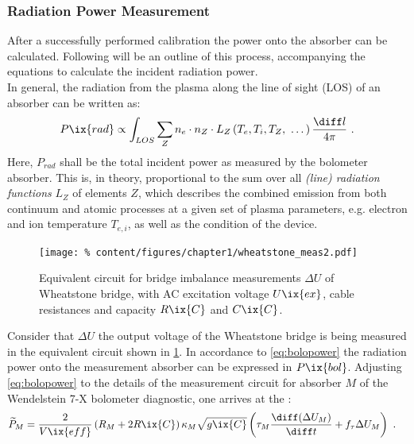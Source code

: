             \subsubsection*{Radiation Power Measurement}%
%
                After a successfully performed calibration the power onto the absorber can be calculated. Following will be an outline of this process, accompanying the equations to calculate the incident radiation power.\\%
                In general, the radiation from the plasma along the line of sight (LOS) of an absorber can be written as:%
%
                \begin{align}%
                    P\ix{rad}\propto\int_{LOS}\sum_{Z}n_{e}\cdot n_{Z}\cdot L_{Z}\left(T_{e}, T_{i}, T_{Z},\,\,\dots\right)\frac{\diff l}{4\pi}\,\,.\label{eq:lineradiation}%
                \end{align}%
%
                Here, $P_{rad}$ shall be the total incident power as measured by the bolometer absorber. This is, in theory, proportional to the sum over all \textit{(line) radiation functions} $L_{Z}$ of elements $Z$, which describes the combined emission from both continuum and atomic processes at a given set of plasma parameters, e.g. electron and ion temperature $T_{e,i}$, as well as the condition of the device.\\%
%
                \begin{figure}
                    \centering%
                    \texttt{[image: \%
                        content/figures/chapter1/wheatstone\_meas2.pdf]}%
                    \caption{Equivalent circuit for bridge imbalance measurements $\Delta U$ of Wheatstone bridge, with AC excitation voltage $U\ix{ex}$, cable resistances and capacity $R\ix{C}$ and $C\ix{C}$.}\label{fig:wheatstone_meas}%
                \end{figure}
%
                Consider that $\Delta U$ the output voltage of the Wheatstone bridge is being measured in the equivalent circuit shown in \cref{fig:wheatstone_meas}. In accordance to \cref{eq:bolopower} the radiation power onto the measurement absorber can be expressed in $P\ix{bol}$. Adjusting \cref{eq:bolopower} to the details of the measurement circuit for absorber $M$ of the Wendelstein 7-X bolometer diagnostic, one arrives at the :%
%
                \begin{align}%
                        \widetilde{P}_{M}=\frac{2}{V\ix{eff}}&\left(R_{M}+2R\ix{C}\right)\kappa_{M}\sqrt{g\ix{C}}\left(\tau_{M}\frac{\diff(\Delta U_{M})}{\diff t}+f_{\tau}\Delta U_{M}\right)\,\,.\label{eq:bolometer}%
                \end{align}%
